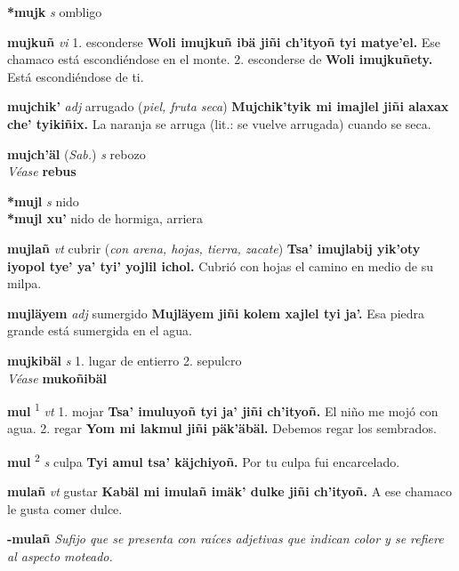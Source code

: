 \documentclass[10pt]{scrbook}
\newcommand{\entry}[1]{\textbf{#1}}
\newcommand{\onedefinition}[1]{#1.}
\newcommand{\defsuperscript}[1]{\textsuperscript{#1}}
\newcommand{\nontranslationdef}[1]{\textit{#1}}
\newcommand{\partofspeech}[1]{\textit{#1}}
\newcommand{\spanishtranslation}[1]{#1}
\newcommand{\clarification}[1]{(\textit{#1})}
\newcommand{\cholexample}[1]{\textbf{#1}}
\newcommand{\exampletranslation}[1]{#1}
\newcommand{\alsosee}[1]{\\\textit{Véase} \textbf{#1}}
\newcommand{\relevantdialect}[1]{(\textit{#1})}
\newcommand{\secondaryentry}[1]{\\\textbf{#1}}
\newcommand{\secondtranslation}[1]{#1}
\begin{document}
\begin{multicols}{2}
\entry{*mujk}
\partofspeech{s}
\spanishtranslation{ombligo}

\entry{mujkuñ}
\partofspeech{vi}
\onedefinition{1}
\spanishtranslation{esconderse}
\cholexample{Woli imujkuñ ibä jiñi ch'ityoñ tyi matye'el.}
\exampletranslation{Ese chamaco está escondiéndose en el monte.}
\onedefinition{2}
\spanishtranslation{esconderse de}
\cholexample{Woli imujkuñety.}
\exampletranslation{Está escondiéndose de ti.}

\entry{mujchik'}
\partofspeech{adj}
\spanishtranslation{arrugado}
\clarification{piel, fruta seca}
\cholexample{Mujchik'tyik mi imajlel jiñi alaxax che' tyikiñix.}
\exampletranslation{La naranja se arruga (lit.: se vuelve arrugada) cuando se seca.}

\entry{mujch'äl}
\relevantdialect{Sab.}
\partofspeech{s}
\spanishtranslation{rebozo}
\alsosee{rebus}

\entry{*mujl}
\partofspeech{s}
\spanishtranslation{nido}
\secondaryentry{*mujl xu'}
\secondtranslation{nido de hormiga, arriera}

\entry{mujlañ}
\partofspeech{vt}
\spanishtranslation{cubrir}
\clarification{con arena, hojas, tierra, zacate}
\cholexample{Tsa' imujlabij yik'oty iyopol tye' ya' tyi' yojlil ichol.}
\exampletranslation{Cubrió con hojas el camino en medio de su milpa.}

\entry{mujläyem}
\partofspeech{adj}
\spanishtranslation{sumergido}
\cholexample{Mujläyem jiñi kolem xajlel tyi ja'.}
\exampletranslation{Esa piedra grande está sumergida en el agua.}

\entry{mujkibäl}
\partofspeech{s}
\onedefinition{1}
\spanishtranslation{lugar de entierro}
\onedefinition{2}
\spanishtranslation{sepulcro}
\alsosee{mukoñibäl}

\entry{mul}
\defsuperscript{1}
\partofspeech{vt}
\onedefinition{1}
\spanishtranslation{mojar}
\cholexample{Tsa' imuluyoñ tyi ja' jiñi ch'ityoñ.}
\exampletranslation{El niño me mojó con agua.}
\onedefinition{2}
\spanishtranslation{regar}
\cholexample{Yom mi lakmul jiñi päk'äbäl.}
\exampletranslation{Debemos regar los sembrados.}

\entry{mul}
\defsuperscript{2}
\partofspeech{s}
\spanishtranslation{culpa}
\cholexample{Tyi amul tsa' käjchiyoñ.}
\exampletranslation{Por tu culpa fui encarcelado.}

\entry{mulañ}
\partofspeech{vt}
\spanishtranslation{gustar}
\cholexample{Kabäl mi imulañ imäk' dulke jiñi ch'ityoñ.}
\exampletranslation{A ese chamaco le gusta comer dulce.}

\entry{-mulañ}
\nontranslationdef{Sufijo que se presenta con raíces adjetivas que indican color y se refiere al aspecto moteado.}


\end{multicols}
\end{document}

